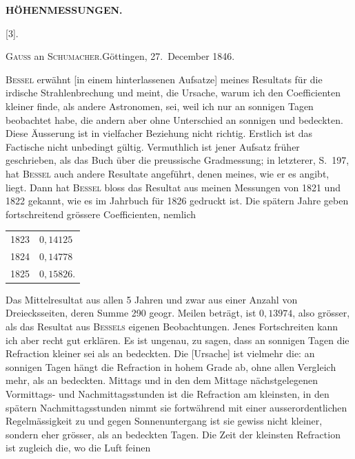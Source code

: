 \par\clearpage
\noindent\null\hfill{\small\textbf{HÖHENMESSUNGEN.}}\hfill{}\par\medskip
\begin{center}
[3].\par{}\par\bigskip
\textsc{Gauss} an \textsc{Schumacher}.\quad Göttingen, 27.~December 1846.
\end{center}
\par\noindent\hspace*{\parindent}\textsc{Bessel} erwähnt [in einem hinterlassenen Aufsatze] meines Resultats für
die irdische Strahlenbrechung und meint, die Ursache, warum ich den Coefficienten kleiner finde, als andere Astronomen, sei, weil ich nur an sonnigen
Tagen beobachtet habe, die andern aber ohne Unterschied an sonnigen und
bedeckten. Diese Äusserung ist in vielfacher Beziehung nicht richtig. Erstlich ist das Factische nicht unbedingt gültig. Vermuthlich ist jener Aufsatz
früher geschrieben, als das Buch über die preussische Gradmessung; in letzterer, S.~197, hat \textsc{Bessel} auch andere Resultate angeführt,  denen
meines, wie er es angibt, liegt. Dann hat \textsc{Bessel} bloss das Resultat aus
meinen Messungen von 1821 und 1822 gekannt, wie es im Jahrbuch für 1826
gedruckt ist. Die spätern Jahre geben fortschreitend grössere Coefficienten,
nemlich
\begin{center}
\begin{tabular}{r@{\ .\ .\ .\ }l}
1823&\(0{,}14125\)\\
1824&\(0{,}14778\)\\
1825&\(0{,}15826\).
\end{tabular}
\end{center}
\par\noindent\hspace*{\parindent}Das Mittelresultat aus allen 5 Jahren und zwar aus einer Anzahl von
Dreiecksseiten, deren Summe 290 geogr. Meilen beträgt, ist \(0{,}13974\), also
grösser, als das Resultat aus \textsc{Bessels} eigenen Beobachtungen. Jenes Fortschreiten kann ich aber recht gut erklären. Es ist ungenau, zu sagen, dass
an sonnigen Tagen die Refraction kleiner sei als an bedeckten. Die [Ursache]
ist vielmehr die: an sonnigen Tagen hängt die Refraction in hohem Grade  ab, ohne allen Vergleich mehr, als an bedeckten. Mittags und
in den dem Mittage nächstgelegenen Vormittags- und Nachmittagsstunden ist die
Refraction am kleinsten, in den spätern Nachmittagsstunden nimmt sie fortwährend mit einer ausserordentlichen Regelmässigkeit zu und gegen Sonnenuntergang ist sie gewiss nicht kleiner, sondern eher grösser, als an bedeckten
Tagen. Die Zeit der kleinsten Refraction ist zugleich die, wo die Luft feinen
\par\medskip\noindent\null\hfill\makebox[0.18\linewidth][l]{56\textsuperscript{*}}\par

